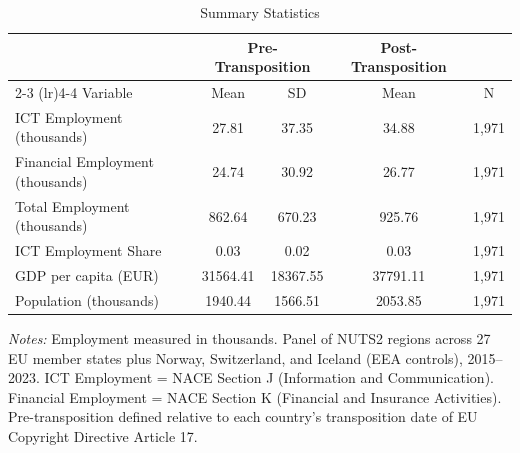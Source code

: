 \begin{table}[htbp]
\centering
\caption{Summary Statistics}
\label{tab:sumstats}
\begin{tabular}{lcccc}
\toprule
& \multicolumn{2}{c}{Pre-Transposition} & Post-Transposition & \\
\cmidrule(lr){2-3} \cmidrule(lr){4-4}
Variable & Mean & SD & Mean & N \\
\midrule
ICT Employment (thousands) & 27.81 & 37.35 & 34.88 & 1,971 \\
Financial Employment (thousands) & 24.74 & 30.92 & 26.77 & 1,971 \\
Total Employment (thousands) & 862.64 & 670.23 & 925.76 & 1,971 \\
ICT Employment Share & 0.03 & 0.02 & 0.03 & 1,971 \\
GDP per capita (EUR) & 31564.41 & 18367.55 & 37791.11 & 1,971 \\
Population (thousands) & 1940.44 & 1566.51 & 2053.85 & 1,971 \\
\bottomrule
\end{tabular}
\begin{tablenotes}
\small
\item \textit{Notes:} Employment measured in thousands. Panel of NUTS2 regions across 27 EU member states plus Norway, Switzerland, and Iceland (EEA controls), 2015--2023. ICT Employment = NACE Section J (Information and Communication). Financial Employment = NACE Section K (Financial and Insurance Activities). Pre-transposition defined relative to each country's transposition date of EU Copyright Directive Article 17.
\end{tablenotes}
\end{table}
